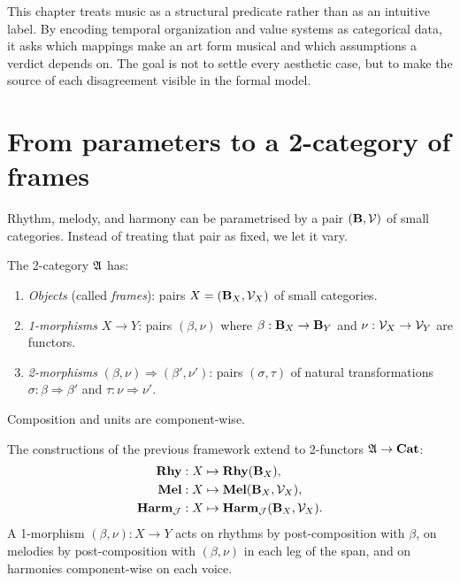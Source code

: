This chapter treats music as a structural predicate rather than as an intuitive
label. By encoding temporal organization and value systems as categorical data,
it asks which mappings make an art form musical and which assumptions a verdict
depends on. The goal is not to settle every aesthetic case, but to make the
source of each disagreement visible in the formal model.

\section{From parameters to a 2-category of frames}

Rhythm, melody, and harmony can be parametrised by a pair $(\mathbf{B}, \mathcal{V})$
of small categories. Instead of treating that pair as fixed, we let it
vary.

\begin{definition}\label{def:frames}
The 2-category $\mathfrak{A}$ has:
\begin{enumerate}[label=\textup{(\roman*)}, leftmargin=2em]
\item \emph{Objects} (called \emph{frames}): pairs
$X = (\mathbf{B}_X, \mathcal{V}_X)$ of small categories.
\item \emph{1-morphisms} $X \to Y$: pairs
$(\beta, \nu)$ where $\beta : \mathbf{B}_X \to \mathbf{B}_Y$ and $\nu : \mathcal{V}_X \to \mathcal{V}_Y$
are functors.
\item \emph{2-morphisms} $(\beta, \nu) \Rightarrow (\beta', \nu')$:
pairs $(\sigma, \tau)$ of natural transformations
$\sigma : \beta \Rightarrow \beta'$ and $\tau : \nu \Rightarrow \nu'$.
\end{enumerate}
Composition and units are component-wise.
\end{definition}

\begin{construction}
The constructions of the previous framework extend to 2-functors
$\mathfrak{A} \to \mathbf{Cat}$:
\begin{align*}
\mathbf{Rhy}   &: X \mapsto \mathbf{Rhy}(\mathbf{B}_X), \\
\mathbf{Mel}   &: X \mapsto \mathbf{Mel}(\mathbf{B}_X, \mathcal{V}_X), \\
\mathbf{Harm}_{\mathcal{J}} &: X \mapsto \mathbf{Harm}_{\mathcal{J}}(\mathbf{B}_X, \mathcal{V}_X).
\end{align*}
A 1-morphism $(\beta, \nu) : X \to Y$ acts on rhythms by
post-composition with $\beta$, on melodies by post-composition with
$(\beta, \nu)$ in each leg of the span, and on harmonies
component-wise on each voice.
\end{construction}

